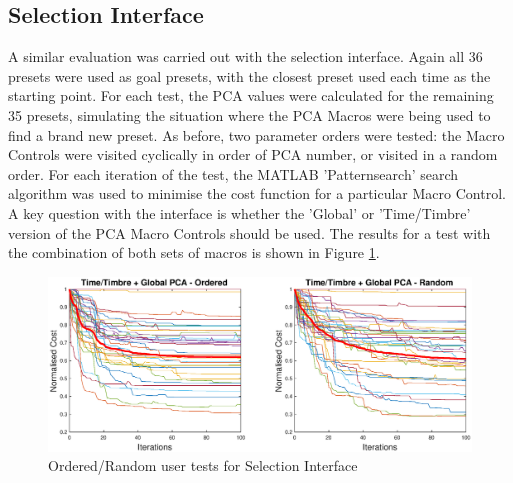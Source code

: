 \documentclass[11pt, oneside]{report}   	%
\begin{document}
\subsection{Selection Interface}
A similar evaluation was carried out with the selection interface. Again all 36 presets were used as goal presets, with the closest preset used each time as the starting point. For each test, the PCA values were calculated for the remaining 35 presets, simulating the situation where the PCA Macros were being used to find a brand new preset. As before, two parameter orders were tested: the Macro Controls were visited cyclically in order of PCA number, or visited in a random order. For each iteration of the test, the MATLAB 'Patternsearch' search algorithm was used to minimise the cost function for a particular Macro Control. \\ 
A key question with the interface is whether the 'Global' or 'Time/Timbre' version of the PCA Macro Controls should be used. The results for a test with the combination of both sets of macros is shown in Figure \ref{fig:PCAtest1}.
\begin{figure}
	\centering
	\includegraphics[width = \textwidth]{PCAInterfaceTests1.eps}
	\caption{Ordered/Random user tests for Selection Interface}
	\label{fig:PCAtest1}
\end{figure}
\end{document}
